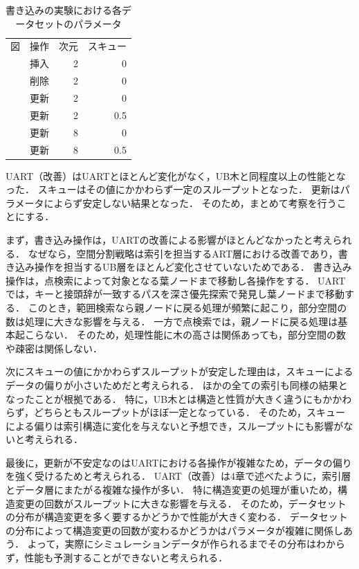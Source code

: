 \begin{table}[tb]
  \caption{書き込みの実験における各データセットのパラメータ}
  \label{tab:rec}
  \centering \small
  \begin{tabular}{llrr}
    \toprule
    図                              & 操作 & 次元 & スキュー \\
    \cmidrule(lr){1-1}
    \cmidrule(lr){2-2}
    \cmidrule(lr){3-3}
    \cmidrule(lr){4-4}
    \Fig{\ref{graph:rec-ins}}       & 挿入 & 2    & 0        \\
    \Fig{\ref{graph:rec-del}}       & 削除 & 2    & 0        \\
    \Fig{\ref{graph:rec-upd-2-0}}   & 更新 & 2    & 0        \\
    \Fig{\ref{graph:rec-upd-2-0.5}} & 更新 & 2    & 0.5      \\
    \Fig{\ref{graph:rec-upd-8-0}}   & 更新 & 8    & 0        \\
    \Fig{\ref{graph:rec-upd-8-0.5}} & 更新 & 8    & 0.5      \\
    \bottomrule
  \end{tabular}
\end{table}

UART（改善）はUARTとほとんど変化がなく，UB木と同程度以上の性能となった．
スキューはその値にかかわらず一定のスループットとなった．
更新はパラメータによらず安定しない結果となった．
そのため，まとめて考察を行うことにする．

まず，書き込み操作は，UARTの改善による影響がほとんどなかったと考えられる．
なぜなら，空間分割戦略は索引を担当するART層における改善であり，書き込み操作を担当するUB層をほとんど変化させていないためである．
書き込み操作は，点検索によって対象となる葉ノードまで移動し各操作をする．
UARTでは，キーと接頭辞が一致するパスを深さ優先探索で発見し葉ノードまで移動する．
このとき，範囲検索なら親ノードに戻る処理が頻繁に起こり，部分空間の数は処理に大きな影響を与える．
一方で点検索では，親ノードに戻る処理は基本起こらない．
そのため，処理性能に木の高さは関係あっても，部分空間の数や疎密は関係しない．

次にスキューの値にかかわらずスループットが安定した理由は，スキューによるデータの偏りが小さいためだと考えられる．
ほかの全ての索引も同様の結果となったことが根拠である．
特に，UB木と\RTree は構造と性質が大きく違うにもかかわらず，どちらともスループットがほぼ一定となっている．
そのため，スキューによる偏りは索引構造に変化を与えないと予想でき，スループットにも影響がないと考えられる．


最後に，更新が不安定なのはUARTにおける各操作が複雑なため，データの偏りを強く受けるためと考えられる．
UART（改善）は4章で述べたように，索引層とデータ層にまたがる複雑な操作が多い．
特に構造変更の処理が重いため，構造変更の回数がスループットに大きな影響を与える．
そのため，データセットの分布が構造変更を多く要するかどうかで性能が大きく変わる．
データセットの分布によって構造変更の回数が変わるかどうかはパラメータが複雑に関係しあう．
よって，実際にシミュレーションデータが作られるまでその分布はわからず，性能も予測することができないと考えられる．

